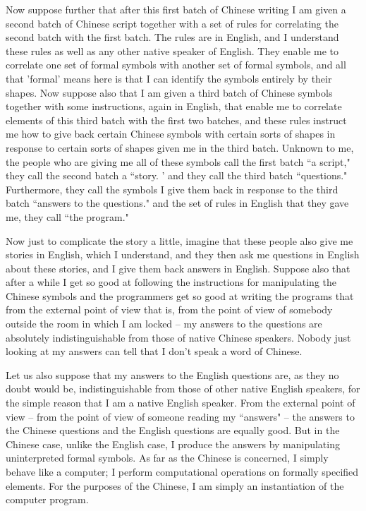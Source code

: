 Now suppose further that after this first batch of Chinese writing I am given a second batch of Chinese script
together with a set of rules for correlating the second batch with the first batch. The rules are in English, and I
understand these rules as well as any other native speaker of English. They enable me to correlate one set of
formal symbols with another set of formal symbols, and all that 'formal' means here is that I can identify the
symbols entirely by their shapes. Now suppose also that I am given a third batch of Chinese symbols together
with some instructions, again in English, that enable me to correlate elements of this third batch with the first two
batches, and these rules instruct me how to give back certain Chinese symbols with certain sorts of shapes in
response to certain sorts of shapes given me in the third batch. Unknown to me, the people who are giving me
all of these symbols call the first batch ``a script," they call the second batch a ``story. ' and they call the third
batch ``questions." Furthermore, they call the symbols I give them back in response to the third batch ``answers
to the questions." and the set of rules in English that they gave me, they call ``the program."

Now just to complicate the story a little, imagine that these people also give me stories in English, which I
understand, and they then ask me questions in English about these stories, and I give them back answers in
English. Suppose also that after a while I get so good at following the instructions for manipulating the Chinese
symbols and the programmers get so good at writing the programs that from the external point of view that is,
from the point of view of somebody outside the room in which I am locked -- my answers to the questions are
absolutely indistinguishable from those of native Chinese speakers. Nobody just looking at my answers can tell
that I don't speak a word of Chinese.

Let us also suppose that my answers to the English questions are, as they no doubt would be, indistinguishable
from those of other native English speakers, for the simple reason that I am a native English speaker. From the
external point of view -- from the point of view of someone reading my ``answers" -- the answers to the
Chinese questions and the English questions are equally good. But in the Chinese case, unlike the English case,
I produce the answers by manipulating uninterpreted formal symbols. As far as the Chinese is concerned, I
simply behave like a computer; I perform computational operations on formally specified elements. For the
purposes of the Chinese, I am simply an instantiation of the computer program.

